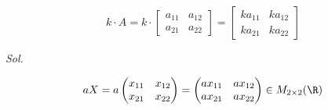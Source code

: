 \begin{problem}
\begin{equation}
	k\cdot A=k\cdot \begin{bmatrix}a_{11}&a_{12}\\a_{21}&a_{22}\end{bmatrix}=\begin{bmatrix}ka_{11}&ka_{12}\\ka_{21}&ka_{22}\end{bmatrix}
\end{equation}
\end{problem}

\textit{ Sol. }


\begin{exercise}
	\begin{equation*}
		aX=a\begin{pmatrix}
			x_{11}&x_{12}\\x_{21}&x_{22}\end{pmatrix}=\begin{pmatrix}
			ax_{11} & ax_{12} \\ax_{21}&ax_{22}
		\end{pmatrix}\in M_{2\times 2}(\R)
	\end{equation*}
\end{exercise}


